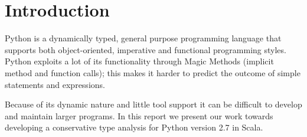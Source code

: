 \chapter{Introduction}
Python is a dynamically typed, general purpose programming language that supports both object-oriented, imperative and functional programming styles. 
Python exploits a lot of its functionality through Magic Methods (implicit method and function calls); this makes it harder to predict the outcome of simple statements and expressions. 

Because of its dynamic nature and little tool support it can be difficult to develop and maintain larger programs. 
In this report we present our work towards developing a conservative type analysis for Python version 2.7 in Scala.
